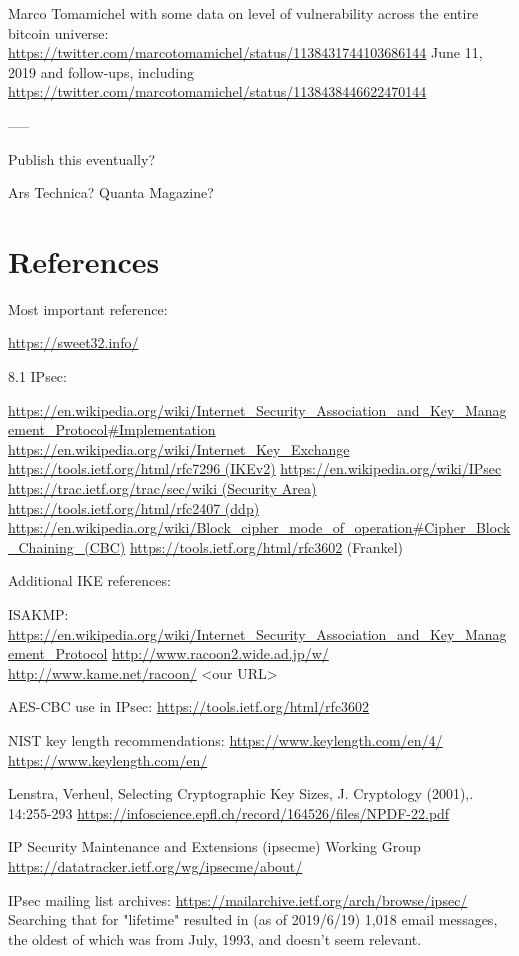 \documentclass[%
 aip,
 jmp,%
 amsmath,amssymb,
 reprint,%
]{revtex4-1}
\begin{document}
Marco Tomamichel with some data on level of vulnerability across the
entire bitcoin universe:
\url{https://twitter.com/marcotomamichel/status/1138431744103686144}
June 11, 2019
and follow-ups, including
\url{https://twitter.com/marcotomamichel/status/1138438446622470144}


-----

Publish this eventually?

Ars Technica?
Quanta Magazine?

\section{References}

Most important reference:

\url{https://sweet32.info/}

8.1 IPsec:

\url{https://en.wikipedia.org/wiki/Internet_Security_Association_and_Key_Management_Protocol#Implementation}
\url{https://en.wikipedia.org/wiki/Internet_Key_Exchange}
\url{https://tools.ietf.org/html/rfc7296 (IKEv2)}
\url{https://en.wikipedia.org/wiki/IPsec}
\url{https://trac.ietf.org/trac/sec/wiki (Security Area)}
\url{https://tools.ietf.org/html/rfc2407 (ddp)}
\url{https://en.wikipedia.org/wiki/Block_cipher_mode_of_operation#Cipher_Block_Chaining_(CBC)}
\url{https://tools.ietf.org/html/rfc3602} (Frankel)

Additional IKE references:

ISAKMP:
\url{https://en.wikipedia.org/wiki/Internet_Security_Association_and_Key_Management_Protocol}
\url{http://www.racoon2.wide.ad.jp/w/}
\url{http://www.kame.net/racoon/}
<our URL>

AES-CBC use in IPsec:
\url{https://tools.ietf.org/html/rfc3602}

NIST key length recommendations:
\url{https://www.keylength.com/en/4/}
\url{https://www.keylength.com/en/}

Lenstra, Verheul, Selecting Cryptographic Key Sizes, J. Cryptology
(2001),. 14:255-293
\url{https://infoscience.epfl.ch/record/164526/files/NPDF-22.pdf}

IP Security Maintenance and Extensions (ipsecme) Working Group
\url{https://datatracker.ietf.org/wg/ipsecme/about/}

IPsec mailing list archives:
\url{https://mailarchive.ietf.org/arch/browse/ipsec/}
Searching that for "lifetime" resulted in (as of 2019/6/19) 1,018
email messages, the oldest of which was from July, 1993, and doesn't
seem relevant.
\end{document}

